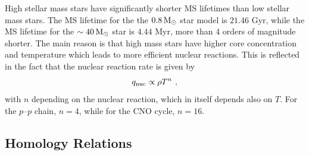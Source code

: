 High stellar mass stars have significantly shorter MS lifetimes than low stellar mass stars. The MS lifetime for the the  $0.8 \, {\rm M}_\odot$ star model is $21.46$ Gyr, while the MS lifetime for the $\sim 40 \, {\rm M}_\odot$ star is $4.44$ Myr, more than 4 orders of magnitude shorter. The main reason is that high mass stars have higher core concentration and temperature which leads to more efficient nuclear reactions. This is reflected in the fact that the nuclear reaction rate is given by
\begin{equation}
    q_{\rm nuc} \propto \rho T^n \ ,
\end{equation}
with $n$ depending on the nuclear reaction, which in itself depends also on $T$. For the $p\text{--}p$ chain, $n=4$, while for the CNO cycle, $n=16$.



\subsection{Homology Relations}

